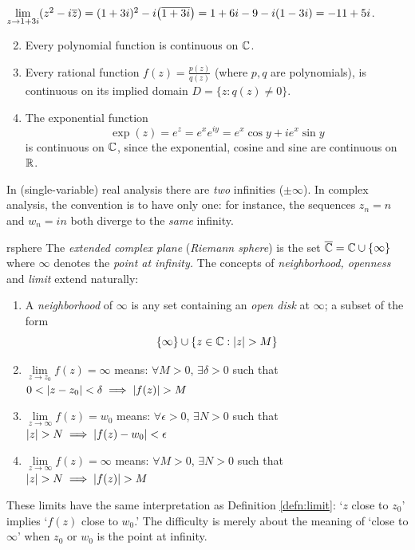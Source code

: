 \begin{examples}{}{}
	\exstart $\lim\limits_{z\to 1+3i}(z^2-i\overline{z}) =(1+3i)^2-i\bigl(\overline{1+3i}\bigr) =1+6i-9-i(1-3i)=-11+5i$.
	\begin{enumerate}\setcounter{enumi}{1}
	  \item Every polynomial function is continuous on $\mathbb{C}$.
	  \item Every rational function $f(z)=\frac{p(z)}{q(z)}$ (where $p,q$ are polynomials), is continuous on its implied domain $D=\{z:q(z)\neq 0\}$.
	  \item The exponential function
	  \[
	  	\exp(z)=e^z=e^xe^{iy}=e^x\cos y+ie^x\sin y
	  \]
	  is continuous on $\mathbb{C}$, since the exponential, cosine and sine are continuous on $\mathbb{R}$.
	\end{enumerate}
\end{examples}

\vfil\goodbreak



In (single-variable) real analysis there are \emph{two} infinities ($\pm\infty$). In complex analysis, the convention is to have only one: for instance, the sequences $z_n=n$ and $w_n=in$ both diverge to the \emph{same} infinity.

\begin{defn}{}{rsphere}
	The \emph{extended complex plane} (\emph{Riemann sphere}) is the set $\overline{\mathbb{C}}=\mathbb{C}\cup\{\infty\}$ where $\infty$ denotes the \emph{point at infinity.} The concepts of \emph{neighborhood, openness} and \emph{limit} extend naturally:
	\begin{enumerate}
	  \item A \emph{neighborhood} of $\infty$ is any set containing an \emph{open disk} at $\infty$; a subset of the form
		\[
			\{\infty\}\cup\{z\in\C:\nm{z}>M\}
		\]
	  \item $\lim\limits_{z\to z_0}f(z)=\infty$ means: $\forall M>0$, $\exists \delta>0$ such that $0<\nm{z-z_0}<\delta \implies \nm{f(z)}>M$
	  \item $\lim\limits_{z\to \infty}f(z)=w_0$ means: $\forall \epsilon>0$, $\exists N>0$ such that $\nm{z}>N \implies \nm{f(z)-w_0}<\epsilon$
	  \item $\lim\limits_{z\to\infty}f(z)=\infty$ means: $\forall M>0$, $\exists N>0$ such that $\nm{z}>N\implies \nm{f(z)}>M$
	\end{enumerate}
\end{defn}

These limits have the same interpretation as Definition \ref{defn:limit}: `$z$ close to $z_0$' implies `$f(z)$ close to $w_0$.' The difficulty is merely about the meaning of `close to $\infty$' when $z_0$ or $w_0$ is the point at infinity. 

